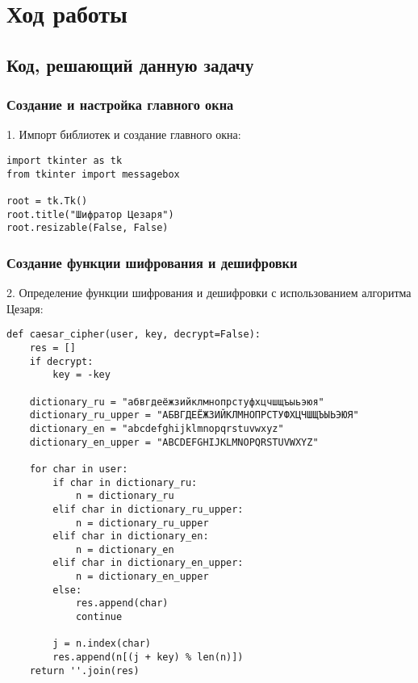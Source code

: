 \documentclass[12pt,a4paper]{scrartcl}
\begin{document}
\newpage

\section{Ход работы}

\subsection{Код, решающий данную задачу}

\subsubsection{Создание и настройка главного окна}
1. Импорт библиотек и создание главного окна:
\begin{verbatim}
import tkinter as tk
from tkinter import messagebox

root = tk.Tk()
root.title("Шифратор Цезаря")
root.resizable(False, False)
\end{verbatim}

\subsubsection{Создание функции шифрования и дешифровки}
2. Определение функции шифрования и дешифровки с использованием алгоритма Цезаря:
\begin{verbatim}
def caesar_cipher(user, key, decrypt=False):
    res = []
    if decrypt:
        key = -key

    dictionary_ru = "абвгдеёжзийклмнопрстуфхцчшщъыьэюя"
    dictionary_ru_upper = "АБВГДЕЁЖЗИЙКЛМНОПРСТУФХЦЧШЩЪЫЬЭЮЯ"
    dictionary_en = "abcdefghijklmnopqrstuvwxyz"
    dictionary_en_upper = "ABCDEFGHIJKLMNOPQRSTUVWXYZ"

    for char in user:
        if char in dictionary_ru:
            n = dictionary_ru
        elif char in dictionary_ru_upper:
            n = dictionary_ru_upper
        elif char in dictionary_en:
            n = dictionary_en
        elif char in dictionary_en_upper:
            n = dictionary_en_upper
        else:
            res.append(char)
            continue

        j = n.index(char)
        res.append(n[(j + key) % len(n)])
    return ''.join(res)
\end{verbatim}
\end{document}
